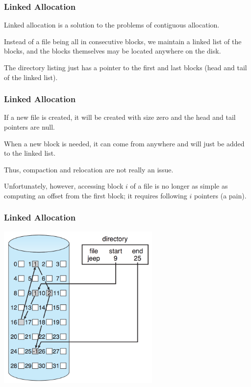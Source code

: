\begin{frame}
	\frametitle{Linked Allocation}

	Linked allocation is a solution to the problems of contiguous allocation.

	Instead of a file being all in consecutive blocks, we maintain a linked list of the blocks, and the blocks themselves may be located anywhere on the disk.

	The directory listing just has a pointer to the first and last blocks (head and tail of the linked list).

\end{frame}

\begin{frame}
	\frametitle{Linked Allocation}

	If a new file is created, it will be created with size zero and the head and tail pointers are null.

	When a new block is needed, it can come from anywhere and will just be added to the linked list.

	Thus, compaction and relocation are not really an issue.

	Unfortunately, however, accessing block $i$ of a file is no longer as simple as computing an offset from the first block; it requires following $i$ pointers (a pain).


\end{frame}

\begin{frame}
	\frametitle{Linked Allocation}

	\begin{center}
		\includegraphics[width=0.6\textwidth]{images/disk-linked.png}
	\end{center}

\end{frame}

